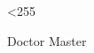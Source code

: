
\makeatletter
{}
\loop \catcode{} \ifnum\@tempcnta<255 \advance \@tempcnta \@ne
\repeat
\makeatother

\newif\ifxueweidoctor %
\newif\ifxueweimaster
\def\temp{Doctor}
\ifx\temp\xuewei
  \xueweidoctortrue  \xueweimasterfalse
\fi
\def\temp{Master}
\ifx\temp\xuewei
  \xueweidoctorfalse  \xueweimastertrue
\fi

\ifxueweidoctor
  \newcommand{\cxuewei}{博士}
  \newcommand{\exuewei}{Doctor}
  \newcommand{\exueweier}{Doctoral}
  \newcommand{\xueweishort}{博}
\fi

\ifxueweimaster
  \newcommand{\cxuewei}{硕士}
  \newcommand{\exuewei}{Master}
  \newcommand{\exueweier}{Master}
  \newcommand{\xueweishort}{硕}
\fi
